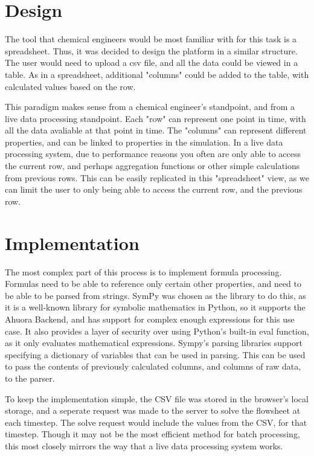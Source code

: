 \section{Design}
The tool that chemical engineers would be most familiar with for this task is a spreadsheet. Thus, it was decided to design the platform in a similar structure. The user would need to upload a csv file, and all the data could be viewed in a table. As in a spreadsheet, additional "columns" could be added to the table, with calculated values based on the row.

This paradigm makes sense from a chemical engineer's standpoint, and from a live data processing standpoint. Each "row" can represent one point in time, with all the data avaliable at that point in time. The "columns" can represent different properties, and can be linked to properties in the simulation. In a live data processing system, due to performance reasons you often are only able to access the current row, and perhaps aggregation functions or other simple calculations from previous rows. This can be easily replicated in this "spreadsheet" view, as we can limit the user to only being able to access the current row, and the previous row.

\section{Implementation}

The most complex part of this process is to implement formula processing. Formulas need to be able to reference only certain other properties, and need to be able to be parsed from strings. SymPy was chosen as the library to do this, as it is a well-known library for symbolic mathematics in Python, so it supports the Ahuora Backend, and has support for complex enough expressions for this use case. It also provides a layer of security over using Python's built-in eval function, as it only evaluates mathematical expressions.
Sympy's parsing libraries support specifying a dictionary of variables that can be used in parsing. This can be used to pass the contents of previously calculated columns, and columns of raw data, to the parser. 

To keep the implementation simple, the CSV file was stored in the browser's local storage, and a seperate request was made to the server to solve the flowsheet at each timestep. The solve request would include the values from the CSV, for that timestep. Though it may not be the most efficient method for batch processing, this most closely mirrors the way that a live data processing system works. 

